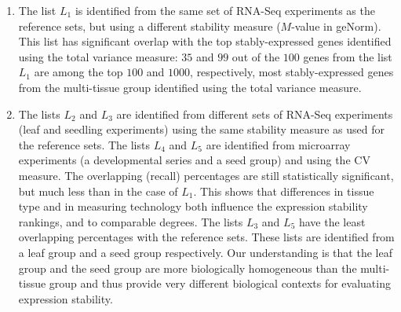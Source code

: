 \documentclass[11pt, a4paper]{article}
\begin{document}
\begin{enumerate}
    \item
	The list $L_1$ is identified from the same set of RNA-Seq experiments as the
	reference sets, but using a different stability measure ($M$-value in
	geNorm). This list has significant overlap with the top
	stably-expressed genes identified using the total variance measure:
	$35$ and $99$ out of the $100$ genes from the list $L_1$ are among the
	top $100$ and $1000$, respectively, most stably-expressed genes from the
	multi-tissue group identified using the total variance measure. 
    \item
	The lists $L_2$ and $L_3$ are identified from different sets of
	RNA-Seq experiments (leaf and seedling experiments) using the same
	stability measure as used for the reference sets. The lists $L_4$ and $L_5$ are
	identified from microarray experiments (a developmental series and a
	seed group) and using the CV measure. The overlapping (recall)
	percentages are still statistically significant, but much less than in
	the case of $L_1$.  This shows that differences in tissue type and in
	measuring technology both influence the expression stability rankings,
	and to comparable degrees. The lists $L_3$ and $L_5$ have the least
	overlapping percentages with the reference sets. These lists are
	identified from a leaf group and a seed group respectively.
	Our understanding is that the leaf group and the seed group are more
	biologically homogeneous than the multi-tissue group and thus provide
	very different biological contexts for evaluating expression stability.
\end{enumerate}


\end{document}
